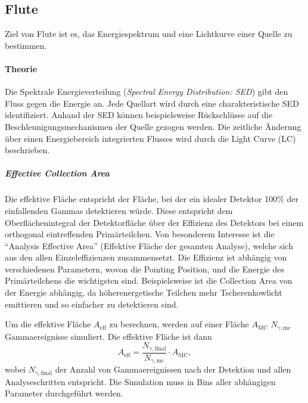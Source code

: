 \subsection{Flute}%
\label{sub:flute}

Ziel von Flute ist es,
das Energiespektrum und
eine Lichtkurve einer Quelle zu bestimmen.

\paragraph{Theorie}%

Die
Spektrale Energieverteilung (\textit{Spectral Energy Distribution: SED})
gibt den Fluss gegen die Energie an.
Jede Quellart wird durch eine charakteristische SED identifiziert.
Anhand der SED können beispielsweise Rückschlüsse auf die
Beschleunigungsmechanismen der Quelle gezogen werden.
Die zeitliche Änderung über einen Energiebereich integrierten Flusses wird durch die Light Curve (LC) beschrieben.

\subparagraph{Effective Collection Area}
Die effektive Fläche entspricht der Fläche,
bei der ein idealer Detektor 100\%
der einfallenden Gammas detektieren würde.
Diese entspricht dem Oberflächenintegral der Detektorfläche
über der Effizienz des Detektors
bei einem orthogonal eintreffenden Primärteilchen.
Von besonderem Interesse ist die \enquote{Analysis Effective Area}
(Effektive Fläche der gesamten Analyse),
welche sich aus den allen Einzeleffizienzen zusammensetzt.
Die Effizienz ist abhängig von verschiedenen Parametern,
wovon die Pointing Position,
und die Energie des Primärteilchens
die wichtigsten sind.
Beispielsweise ist die Collection Area von der Energie abhängig,
da höherenergetische Teilchen mehr Tscherenkowlicht emittieren
und so einfacher zu detektieren sind.

Um die effektive Fläche $A_{\text{eff}}$ zu berechnen,
werden auf einer Fläche $A_{\text{MC}}$ $N_{\gamma,\text{mc}}$ Gammaereignisse simuliert.
Die effektive Fläche ist dann
\begin{equation}%
  \label{eq:effective_area}
  A_{\text{eff}} =
    \frac{N_{\gamma,\text{final}}}{N_{\gamma,\text{mc}}}
    \cdot A_{\text{MC}} ,
\end{equation}
wobei $N_{\gamma,\text{final}}$ der Anzahl von Gammaereignissen nach der Detektion
und allen Analyseschritten entspricht.
Die Simulation muss in Bins aller abhängigen Parameter durchgeführt werden.




